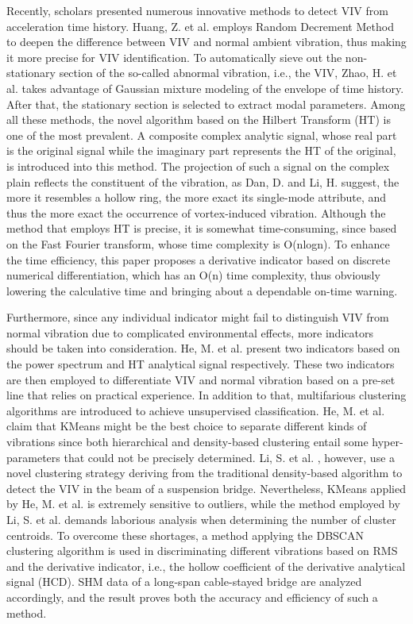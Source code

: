 \documentclass[preprint, 3p, times, compress, 11pt]{elsarticle}
\begin{document}
Recently, scholars presented numerous innovative methods to detect VIV 
from acceleration time history. Huang, Z. et al. \cite{huang2019automatic} 
employs Random Decrement Method to deepen the difference between VIV 
and normal ambient vibration, thus making it more precise for VIV 
identification. To automatically sieve out the non-stationary section of 
the so-called abnormal vibration, i.e., the VIV, Zhao, H. et al. 
\cite{zhao2022statemonitoring} takes advantage of Gaussian mixture 
modeling of the envelope of time history. After that, the stationary 
section is selected to extract modal parameters. Among all these methods, 
the novel algorithm based on the Hilbert Transform (HT) 
is one of the most prevalent. A composite complex analytic signal, whose 
real part is the original signal while the imaginary part represents the 
HT of the original, is introduced into this method. The projection of 
such a signal on the complex plain reflects the constituent of the 
vibration, as Dan, D. and Li, H. \cite{dan2022monitoring} suggest, the 
more it resembles a hollow ring, the more exact its single-mode attribute, 
and thus the more exact the occurrence of vortex-induced vibration. 
Although the method that employs HT is precise, it is somewhat 
time-consuming, since based on the Fast Fourier transform, whose time 
complexity is O(nlogn). To enhance the time efficiency, this paper 
proposes a derivative indicator based on discrete numerical 
differentiation, which has an O(n) time complexity, thus obviously 
lowering the calculative time and bringing about a dependable on-time warning. 

Furthermore, since any individual indicator might fail to distinguish VIV 
from normal vibration due to complicated environmental effects, more 
indicators should be taken into consideration. He, M. et al. \cite{he2022online} 
present two indicators based on the power spectrum and HT analytical 
signal respectively. These two indicators are then employed to 
differentiate VIV and normal vibration based on a pre-set line that 
relies on practical experience. In addition to that, multifarious 
clustering algorithms are introduced to achieve unsupervised 
classification. He, M. et al. \cite{he2022identification} claim that 
KMeans might be the best choice to separate different kinds of vibrations 
since both hierarchical and density-based clustering entail some 
hyper-parameters that could not be precisely determined. Li, S. et al. 
\cite{li2017cluster}, however, use a novel clustering strategy deriving 
from the traditional density-based algorithm to detect the VIV in the 
beam of a suspension bridge. Nevertheless, KMeans applied by He, M. et al. 
\cite{he2022identification} is extremely sensitive to outliers, while the method 
employed by Li, S. et al. \cite{li2017cluster} demands laborious analysis 
when determining the number of cluster centroids. To overcome these 
shortages, a method applying the DBSCAN clustering algorithm is used 
in discriminating different vibrations based on RMS and the derivative 
indicator, i.e., the hollow coefficient of the derivative analytical 
signal (HCD). SHM data of a long-span cable-stayed bridge are analyzed 
accordingly, and the result proves both the accuracy and efficiency of 
such a method.
\end{document}
